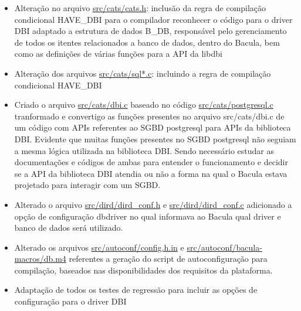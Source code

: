 \begin{itemize}
\item Alteração no arquivo \url{src/cats/cats.h}: 
 \subitem inclusão da regra de compilação condicional HAVE\_DBI para o compilador reconhecer o código para o driver DBI
 \subitem adaptado a estrutura de dados B\_DB, responsável pelo gerenciamento de todos os itentes relacionados a banco de dados, dentro do Bacula, bem como as definições de várias funções para a API da libdbi
\item Alteração dos arquivos \url{src/cats/sql*.c}: incluindo a regra de compilação condicional HAVE\_DBI
\item Criado o arquivo \url{src/cats/dbi.c} baseado no código \url{src/cats/postgresql.c}
 \subitem tranformado e convertigo as funções presentes no arquivo src/cats/dbi.c de um código com APIs referentes ao SGBD postgresql para APIs da  biblioteca DBI. Evidente que muitas funções presentes no SGBD postgresql não seguiam a mesma lógica utilizada na biblioteca DBI. Sendo necessário estudar as documentações e códigos de ambas para entender o funcionamento e decidir se a API da biblioteca DBI atendia ou não a forma na qual o Bacula estava projetado para interagir com um SGBD. 
\item Alterado o arquivo \url{src/dird/dird_conf.h} e \url{src/dird/dird_conf.c}
 \subitem adicionado a opção de configuração dbdriver no qual informava ao Bacula qual driver e banco de dados será utilizado.
\item Alterado os arquivos \url{src/autoconf/config.h.in} e \url{src/autoconf/bacula-macros/db.m4} referentes a geração do script de autoconfiguração para compilação, baseados nas disponibilidades dos requisitos da plataforma.
\item Adaptação de todos os testes de regressão para incluir as opções de configuração para o driver DBI
\end{itemize}

